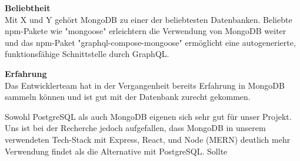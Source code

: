 \textbf{Beliebtheit}\\
Mit X und Y gehört MongoDB zu einer der beliebtesten Datenbanken. Beliebte npm-Pakete wie "mongoose" erleichtern die Verwendung von MongoDB weiter und das npm-Paket "graphql-compose-mongoose" ermöglicht eine autogenerierte, funktionsfähige Schnittstelle durch GraphQL.

\textbf{Erfahrung}\\
Das Entwicklerteam hat in der Vergangenheit bereits Erfahrung in MongoDB sammeln können und ist gut mit der Datenbank zurecht gekommen. 

Sowohl PostgreSQL als auch MongoDB eigenen sich sehr gut für unser Projekt. Uns ist bei der Recherche jedoch aufgefallen, dass MongoDB in unserem verwendeten Tech-Stack mit Express, React, und Node (MERN) deutlich mehr Verwendung findet als die Alternative mit PostgreSQL. Sollte
